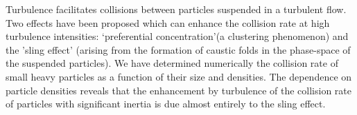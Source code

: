 Turbulence facilitates collisions between particles suspended in a turbulent flow.
Two effects have been proposed which can enhance the collision rate at high turbulence intensities: \lq preferential concentration\rq (a clustering phenomenon) and the 'sling effect' (arising from the formation of caustic folds in the phase-space of the suspended particles).
We have determined numerically the collision rate of small heavy particles as a function of their size and densities.
The dependence on particle densities reveals that the enhancement by turbulence of the collision rate of particles with significant inertia is due almost entirely to the sling effect.
